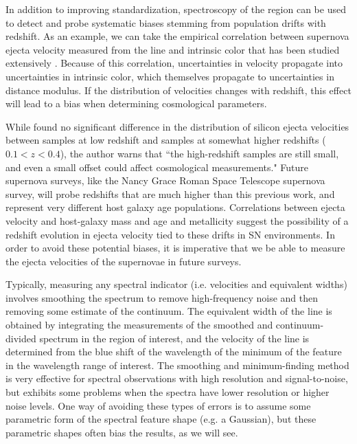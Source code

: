 In addition to improving standardization, spectroscopy of the \siliconii{} region can be used to detect and probe systematic biases stemming from population drifts with redshift. As an example, we can take the empirical correlation between supernova ejecta velocity measured from the \siliconii{} line and intrinsic color that has been studied extensively \citep{wang_improved_2009, foley_measuring_2011, foley_velocity_2011,foley_relation_2012,mandel_type_2014}. Because of this correlation, uncertainties in velocity propagate into uncertainties in intrinsic color, which themselves propagate to uncertainties in distance modulus. If the distribution of velocities changes with redshift, this effect will lead to a bias when determining cosmological parameters.

While \citet{foley_relation_2012} found no significant difference in the distribution of silicon ejecta velocities between samples at low redshift and samples at somewhat higher redshifts ($ 0.1 <  z  < 0.4$), the author warns that ``the high-redshift samples are still small, and even a small offset could affect cosmological measurements."  Future supernova surveys, like the Nancy Grace Roman Space Telescope supernova survey, will probe redshifts that are much higher than this previous work, and represent very different host galaxy age populations. Correlations between ejecta velocity and host-galaxy mass \citep{foley_relation_2012} and age and metallicity \citep{wang_evidence_2013} suggest the possibility of a redshift evolution in ejecta velocity tied to these drifts in SN environments. In order to avoid these potential biases, it is imperative that we be able to measure the ejecta velocities of the supernovae in future surveys.

Typically, measuring any spectral indicator (i.e. velocities and equivalent widths) involves smoothing the spectrum to remove high-frequency noise and then removing some estimate of the continuum. The equivalent width of the line is obtained by integrating the measurements of the smoothed and continuum-divided spectrum in the region of interest, and the velocity of the line is determined from the blue shift of the wavelength of the minimum of the feature in the wavelength range of interest. The smoothing and minimum-finding method is very effective for spectral observations with high resolution and signal-to-noise, but exhibits some problems when the spectra have lower resolution or higher noise levels. One way of avoiding these types of errors is to assume some parametric form of the spectral feature shape (e.g. a Gaussian), but these parametric shapes often bias the results, as we will see.

